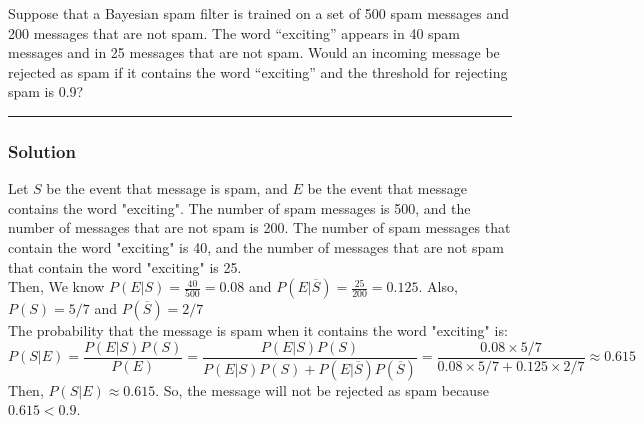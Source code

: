 \newpage
\begin{question}
Suppose that a Bayesian spam filter is trained on a set of 500 spam messages and 200 messages that are not spam. The word “exciting” appears in 40 spam messages and in 25 messages that are not spam. Would an incoming message be rejected as spam if it contains the word “exciting” and the threshold for rejecting spam is 0.9?
\end{question}

\par\noindent\rule{\textwidth}{0.5pt}

\subsubsection*{Solution}

Let $S$ be the event that message is spam, and $E$ be the event that message contains the word "exciting". The number of spam messages is 500, and the number of messages that are not spam is 200. The number of spam messages that contain the word "exciting" is 40, and the number of messages that are not spam that contain the word "exciting" is 25. \\
Then, We know $P(E|S) = \frac {40}{500} = 0.08$ and $P(E|\overline{S}) = \frac {25}{200} = 0.125$. Also, $P(S) = 5/7$ and $P(\overline S) = 2/7$\\
The probability that the message is spam when it contains the word "exciting" is: $$P(S|E) = \frac{P(E|S)P(S)}{P(E)} = \frac{P(E|S)P(S)}{P(E|S)P(S) + P(E|\overline{S})P(\overline{S})} = \frac{0.08 \times 5/7}{0.08 \times 5/7 + 0.125 \times 2/7}\approx 0.615$$
Then, $P(S|E) \approx 0.615$. So, the message will not be rejected as spam because $0.615< 0.9$.